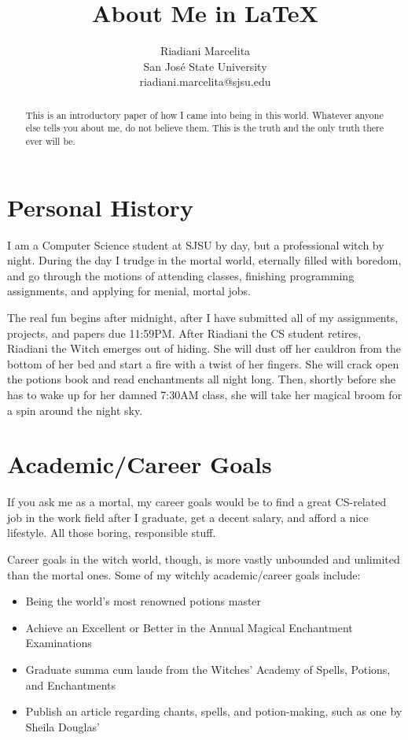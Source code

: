 \documentclass{article}
\title{About Me in \LaTeX}
\author{
  Riadiani Marcelita \\
  San Jos\'{e} State University \\
  riadiani.marcelita@sjsu.edu
  }
\begin{document}
\maketitle

\begin{abstract}
This is an introductory paper of how I came into being in this world. Whatever anyone else tells you about me, do not believe them. This is the truth and the only truth there ever will be.
\end{abstract}

\section{Personal History}\label{sec:personal}
I am a Computer Science student at SJSU by day, but a professional witch by night. During the day I trudge in the mortal world, eternally filled with boredom, and go through the motions of attending classes, finishing programming assignments, and applying for menial, mortal jobs.

The real fun begins after midnight, after I have submitted all of my assignments, projects, and papers due 11:59PM. After Riadiani the CS student retires, Riadiani the Witch emerges out of hiding. She will dust off her cauldron from the bottom of her bed and start a fire with a twist of her fingers. She will crack open the potions book and read enchantments all night long. Then, shortly before she has to wake up for her damned 7:30AM class, she will take her magical broom for a spin around the night sky.

\section{Academic/Career Goals}
If you ask me as a mortal, my career goals would be to find a great CS-related job in the work field after I graduate, get a decent salary, and afford a nice lifestyle. All those boring, responsible stuff.

Career goals in the witch world, though, is more vastly unbounded and unlimited than the mortal ones. Some of my witchly academic/career goals include:

\begin{itemize}
  \item {Being the world's most renowned potions master}
  \item {Achieve an Excellent or Better in the Annual Magical Enchantment Examinations}
  \item {Graduate summa cum laude from the Witches' Academy of Spells, Potions, and Enchantments}
  \item {Publish an article regarding chants, spells, and potion-making, such as one by Sheila Douglas' ~\cite{douglas}}
\end{itemize}
\end{document}
